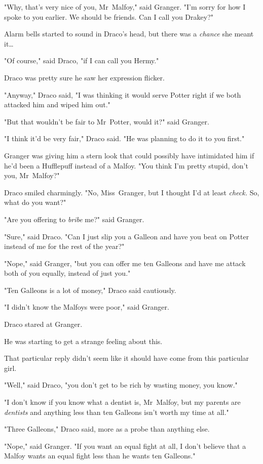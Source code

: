 "Why, that's very nice of you, Mr~Malfoy," said Granger. "I'm sorry for how I
spoke to you earlier. We should be friends. Can I call you Drakey?"

Alarm bells started to sound in Draco's head, but there was a \emph{chance} she
meant it…

"Of course," said Draco, "if I can call you Hermy."

Draco was pretty sure he saw her expression flicker.

"Anyway," Draco said, "I was thinking it would serve Potter right if we both
attacked him and wiped him out."

"But that wouldn't be fair to Mr~Potter, would it?" said Granger.

"I think it'd be very fair," Draco said. "He was planning to do it to you
first."

Granger was giving him a stern look that could possibly have intimidated him if
he'd been a Hufflepuff instead of a Malfoy. "You think I'm pretty stupid, don't
you, Mr~Malfoy?"

Draco smiled charmingly. "No, Miss~Granger, but I thought I'd at least
\emph{check.} So, what do you want?"

"Are you offering to \emph{bribe} me?" said Granger.

"Sure," said Draco. "Can I just slip you a Galleon and have you beat on Potter
instead of me for the rest of the year?"

"Nope," said Granger, "but you can offer me ten Galleons and have me attack
both of you equally, instead of just you."

"Ten Galleons is a lot of money," Draco said cautiously.

"I didn't know the Malfoys were poor," said Granger.

Draco stared at Granger.

He was starting to get a strange feeling about this.

That particular reply didn't seem like it should have come from this particular
girl.

"Well," said Draco, "you don't get to be rich by wasting money, you know."

"I don't know if you know what a dentist is, Mr~Malfoy, but my parents are
\emph{dentists} and anything less than ten Galleons isn't worth my time at all."

"Three Galleons," Draco said, more as a probe than anything else.

"Nope," said Granger. "If you want an equal fight at all, I don't believe that
a Malfoy wants an equal fight less than he wants ten Galleons."

